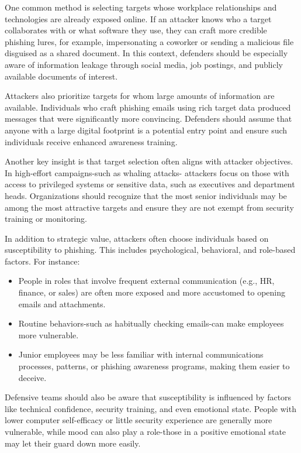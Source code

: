 One common method is selecting targets whose workplace relationships and technologies are already exposed online. If an attacker knows who a target collaborates with or what software they use, they can craft more credible phishing lures, for example, impersonating a coworker or sending a malicious file disguised as a shared document. In this context, defenders should be especially aware of information leakage through social media, job postings, and publicly available documents of interest.

Attackers also prioritize targets for whom large amounts of information are available. Individuals who craft phishing emails using rich target data produced messages that were significantly more convincing. Defenders should assume that anyone with a large digital footprint is a potential entry point and ensure such individuals receive enhanced awareness training.

Another key insight is that target selection often aligns with attacker objectives. In high-effort campaigns-such as whaling attacks- attackers focus on those with access to privileged systems or sensitive data, such as executives and department heads. Organizations should recognize that the most senior individuals may be among the most attractive targets and ensure they are not exempt from security training or monitoring.

In addition to strategic value, attackers often choose individuals based on susceptibility to phishing. This includes psychological, behavioral, and role-based factors. For instance:
\begin{itemize}
    \item People in roles that involve frequent external communication (e.g., HR, finance, or sales) are often more exposed and more accustomed to opening emails and attachments.
    \item Routine behaviors-such as habitually checking emails-can make employees more vulnerable.
    \item Junior employees may be less familiar with internal communications processes, patterns, or phishing awareness programs, making them easier to deceive.
\end{itemize}

Defensive teams should also be aware that susceptibility is influenced by factors like technical confidence, security training, and even emotional state. People with lower computer self-efficacy or little security experience are generally more vulnerable, while mood can also play a role-those in a positive emotional state may let their guard down more easily.

